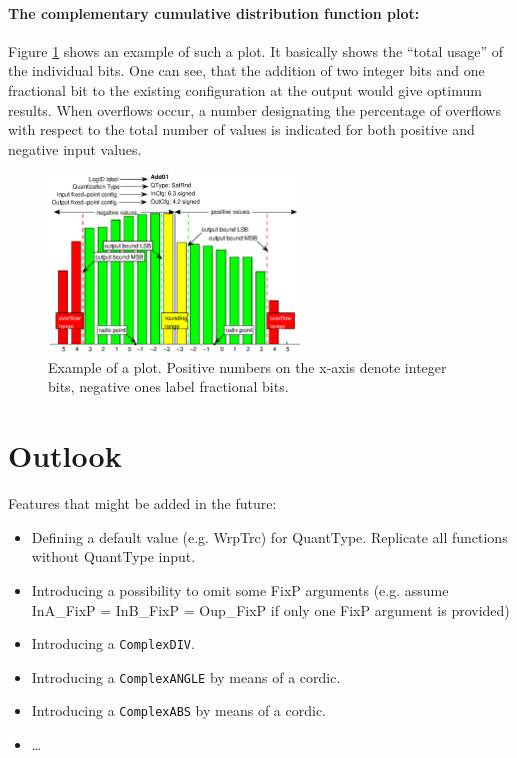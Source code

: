 \documentclass[a4paper,11pt]{article}
\begin{document}
\paragraph{The complementary cumulative distribution function plot:}
Figure \ref{fig.LoggerPlot} shows an example of such a plot. It
basically shows the ``total usage'' of the individual bits. One can
see, that the addition of two integer bits and one fractional bit to
the existing configuration at the output would give optimum results.
When overflows occur, a number designating the percentage of overflows
with respect to the total number of values is indicated for both
positive and negative input values.
\begin{figure}[ht]
  \centering
  \includegraphics[width=0.6\textwidth]{LoggerPlotLabeled}
  \caption{Example of a plot. Positive numbers on the x-axis denote
    integer bits, negative ones label fractional bits.}
  \label{fig.LoggerPlot}
\end{figure}

\section{Outlook}
Features that might be added in the future:
\begin{itemize}
\item Defining a default value (e.g. WrpTrc) for QuantType. Replicate
  all functions without QuantType input.
\item Introducing a possibility to omit some FixP arguments
  (e.g. assume InA\_FixP = InB\_FixP = Oup\_FixP if only one FixP
  argument is provided)
\item Introducing a \texttt{ComplexDIV}.
\item Introducing a \texttt{ComplexANGLE} by means of a cordic.
\item Introducing a \texttt{ComplexABS} by means of a cordic.
\item \dots
\end{itemize}
\end{document}
